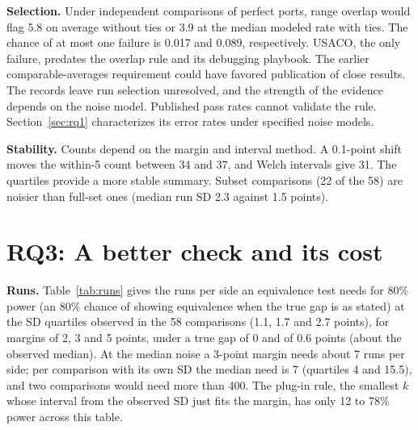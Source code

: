 \documentclass[conference]{IEEEtran}
\begin{document}
\textbf{Selection.} Under independent comparisons of perfect ports, range overlap would flag 5.8 on average without ties or 3.9 at the median modeled rate with ties. The chance of at most one failure is 0.017 and 0.089, respectively. USACO, the only failure, predates the overlap rule and its debugging playbook. The earlier comparable-averages requirement could have favored publication of close results. The records leave run selection unresolved, and the strength of the evidence depends on the noise model. Published pass rates cannot validate the rule. Section~\ref{sec:rq1} characterizes its error rates under specified noise models.

\textbf{Stability.} Counts depend on the margin and interval method. A 0.1-point shift moves the within-5 count between 34 and 37, and Welch intervals give 31. The quartiles provide a more stable summary. Subset comparisons (22 of the 58) are noisier than full-set ones (median run SD 2.3 against 1.5 points).

\section{RQ3: A better check and its cost}
\label{sec:rq3}

\textbf{Runs.} Table~\ref{tab:runs} gives the runs per side an equivalence test needs for 80\% power (an 80\% chance of showing equivalence when the true gap is as stated) at the SD quartiles observed in the 58 comparisons (1.1, 1.7 and 2.7 points), for margins of 2, 3 and 5 points, under a true gap of 0 and of 0.6 points (about the observed median). At the median noise a 3-point margin needs about 7 runs per side; per comparison with its own SD the median need is 7 (quartiles 4 and 15.5), and two comparisons would need more than 400. The plug-in rule, the smallest $k$ whose interval from the observed SD just fits the margin, has only 12 to 78\% power across this table.

\begin{table}[t]
\caption{Runs per side for 80\% power of the pooled-$t$ TOST (5\% level, normal noise, common SD) to show equivalence within $\pm m$ points at the observed SD quartiles, for a true gap of 0 (and of 0.6 points).}
\label{tab:runs}
\centering

\end{table}
\end{document}
